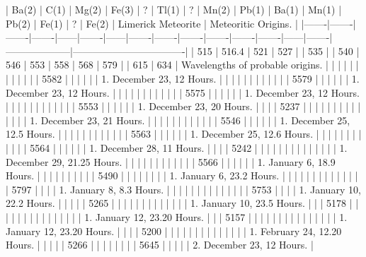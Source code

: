 \documentclass[a4paper, 12pt, oneside, polutonikogreek, english]{article}
\begin{document}
| Ba(2) | C(1) | Mg(2) | Fe(3) | ?  | Tl(1) | ?  | Mn(2) | Pb(1) | Ba(1) | Mn(1) | Pb(2) | Fe(1) | ?  | Fe(2) | Limerick Meteorite | Meteoritic Origins.       |
|-------|-------|-------|-------|------|-------|------|-------|-------|-------|-------|-------|-------|------|-------|--------------------|----------------------------------|
| 515  | 516.4 | 521  | 527  |   | 535  |   | 540  | 546  | 553  | 558  | 568  | 579  |   | 615  | 634        | Wavelengths of probable origins. |
|    |    |    |    |   |    |   |    |    |    | 5582 |    |    |   |    |          | 1. December 23, 12 Hours.    |
|    |    |    |    |   |    |   |    |    |    | 5579 |    |    |   |    |          | 1. December 23, 12 Hours.    |
|    |    |    |    |   |    |   |    |    |    | 5575 |    |    |   |    |          | 1. December 23, 12 Hours.    |
|    |    |    |    |   |    |   |    |    |    | 5553 |    |    |   |    |          | 1. December 23, 20 Hours.    |
|    |    | 5237 |    |   |    |   |    |    |    |    |    |    |   |    |          | 1. December 23, 21 Hours.    |
|    |    |    |    |   |    |   |    |    |    | 5546 |    |    |   |    |          | 1. December 25, 12.5 Hours.   |
|    |    |    |    |   |    |   |    |    |    | 5563 |    |    |   |    |          | 1. December 25, 12.6 Hours.   |
|    |    |    |    |   |    |   |    |    |    | 5564 |    |    |   |    |          | 1. December 28, 11 Hours.    |
|    |    | 5242 |    |   |    |   |    |    |    |    |    |    |   |    |          | 1. December 29, 21.25 Hours.   |
|    |    |    |    |   |    |   |    |    |    | 5566 |    |    |   |    |          | 1. January 6, 18.9 Hours.    |
|    |    |    |    |   |    |   |    | 5490 |    |    |    |    |   |    |          | 1. January 6, 23.2 Hours.    |
|    |    |    |    |   |    |   |    |    |    |    |    | 5797 |   |    |          | 1. January 8, 8.3 Hours.     |
|    |    |    |    |   |    |   |    |    |    |    |    | 5753 |   |    |          | 1. January 10, 22.2 Hours.    |
|    |    |    | 5265 |   |    |   |    |    |    |    |    |    |   |    |          | 1. January 10, 23.5 Hours.    |
|    | 5178 |    |    |   |    |   |    |    |    |    |    |    |   |    |          | 1. January 12, 23.20 Hours.   |
|    | 5157 |    |    |   |    |   |    |    |    |    |    |    |   |    |          | 1. January 12, 23.20 Hours.   |
|    |    | 5200 |    |   |    |   |    |    |    |    |    |    |   |    |          | 1. February 24, 12.20 Hours.   |
|    |    |    | 5266 |   |    |   |    |    |    |    | 5645 |    |   |    |          | 2. December 23, 12 Hours.    |
\end{document}
